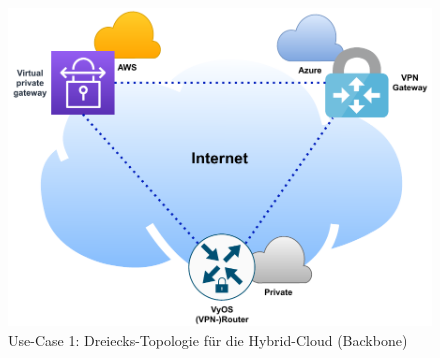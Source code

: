\begin{figure}[h]
  \centering
  \includegraphics{Figures/Use-Case-1_Basis_Deployment.pdf}
  \caption{Use-Case 1: Dreiecks-Topologie für die Hybrid-Cloud (\glqq Backbone\grqq{})}
  \label{grafik:Use-Case-1_Basis_Deployment}
\end{figure}\FloatBarrier

